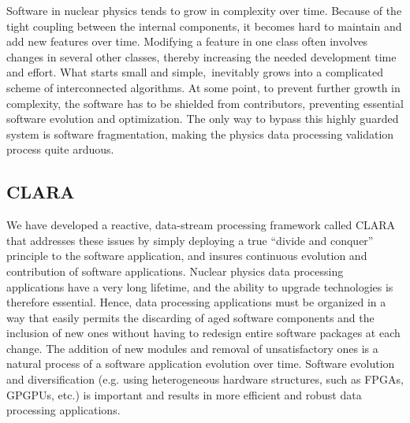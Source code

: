 \documentclass{elsart}
\begin{document}
Software in nuclear physics tends to grow in complexity over time. Because of the tight coupling between
the internal components, it becomes hard to maintain and add new features over time. Modifying a feature
in one class often involves changes in several other classes, thereby increasing the needed development
time and effort. What starts small and simple, inevitably grows into a complicated scheme of interconnected
algorithms. At some point, to prevent further growth in complexity, the software has to be shielded from
contributors, preventing essential software evolution and optimization. The only way to bypass this highly
guarded system is software fragmentation, making the physics data processing validation process quite
arduous.

\subsection{CLARA}

We have developed a reactive, data-stream processing framework called CLARA
\cite{clara-2011,clara-service,framework,clara-2016} that addresses these issues by simply deploying a true
“divide and conquer” principle to the software application, and insures continuous evolution and contribution of
software applications. Nuclear physics data processing applications have a very long lifetime, and the ability to
upgrade technologies is therefore essential. Hence, data processing applications must be organized in a way 
that easily permits the discarding of aged software components and the inclusion of new ones without having to
redesign entire software packages at each change. The addition of new modules and removal of unsatisfactory
ones is a natural process of a software application evolution over time.  Software evolution and diversification
(e.g. using heterogeneous hardware structures, such as FPGAs, GPGPUs, etc.) is important and results in more
efficient and robust data processing applications.
\end{document}

